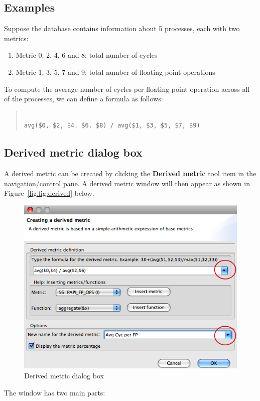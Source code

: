 \documentclass[a4paper,11pt]{article}
\begin{document}
\subsection{Examples} Suppose the database contains information about 5 processes, each with two metrics:  
\begin{enumerate}
	\item Metric 0, 2, 4, 6 and 8: total number of cycles
	\item Metric 1, 3, 5, 7 and 9: total number of floating point operations
\end{enumerate} To compute the average number of cycles per floating point operation across all of the processes, we can define a formula as follows: 
\begin{quotation}
\begin{verbatim}

avg($0, $2, $4. $6. $8) / avg($1, $3, $5, $7, $9)
 \end{verbatim}
\end{quotation}

\subsection{Derived metric dialog box}

 A derived metric can be created by clicking the  \textbf{Derived metric} tool item in the navigation/control pane.  A derived metric window will then appear as shown in Figure~\ref{fig:fig:derived} below.  

\begin{center}
 \begin{figure}
  \includegraphics{images/DerivedMetricDlg.png}
  \caption{Derived metric dialog box}
  \label{fig:derived}
 \end{figure}
\end{center}  The window has two main parts:  
\end{document}
